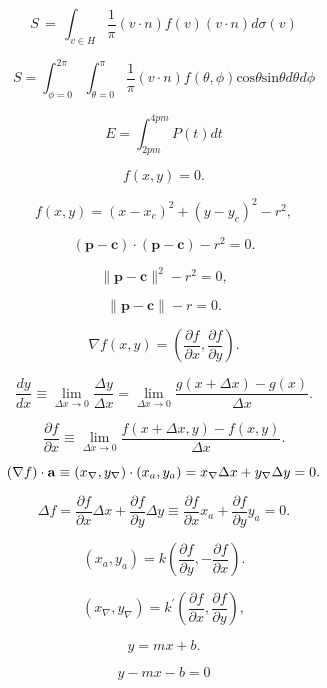 \documentclass[lang=cn,12pt]{elegantbook}
\begin{document}
$$
  S\,=\,\int_{v\in H}\frac{1}{\pi}(v\cdot n)f(v)(v\cdot n)d\sigma(v)
$$

$$
  S=\int_{\phi=0}^{2\pi}\int_{\theta=0}^{\pi}\frac{1}{\pi}(v\cdot n)f(\theta,\phi)\mathrm{cos}\theta\mathrm{sin}\theta d\theta d\phi
$$

$$
  E=\int_{2p m}^{4p m}P(t) dt
$$

$$
  f(x,y)=0.
$$

\begin{equation}
  f(x,y)=(x-x_{c})^{2}+(y-y_{c})^{2}-r^{2},
\end{equation}

$$
  (\mathbf{p}-\mathbf{c})\cdot(\mathbf{p}-\mathbf{c})-r^{2}=0.
$$

$$
  \|\mathbf{p}-\mathbf{c}\|^{2}-r^{2}=0,
$$

$$
  \|\mathbf{p}-\mathbf{c}\|-r=0.
$$

$$
  \nabla f(x,y)=\left({\frac{\partial f}{\partial x}},{\frac{\partial f}{\partial y}}\right).
$$

\begin{equation}
  {\frac{d y}{d x}}\equiv\operatorname*{lim}_{\Delta x\to0}{\frac{\Delta y}{\Delta x}}=\operatorname*{lim}_{\Delta x\to0}{\frac{g(x+\Delta x)-g(x)}{\Delta x}}.
\end{equation}

$$
  {\frac{\partial f}{\partial x}}\equiv\operatorname*{lim}_{\Delta x\to0}{\frac{f(x+\Delta x,y)-f(x,y)}{\Delta x}}.
$$

\begin{equation}
  (\nabla f)\cdot{\bf a}\equiv(x_{\nabla},y_{\nabla})\cdot(x_{a},y_{a})=x_{\nabla}\Delta x+y_{\nabla}\Delta y=0.
\end{equation}

$$
  \Delta f={\frac{\partial f}{\partial x}}\Delta x+{\frac{\partial f}{\partial y}}\Delta y\equiv{\frac{\partial f}{\partial x}}x_{a}+{\frac{\partial f}{\partial y}}y_{a}=0.
$$

\begin{equation}
  (x_{a},y_{a})=k\left({\frac{\partial f}{\partial y}},-{\frac{\partial f}{\partial x}}\right).
\end{equation}

$$
  (x_{\nabla},y_{\nabla})=k^{\prime}\left({\frac{\partial f}{\partial x}},{\frac{\partial f}{\partial y}}\right),
$$

\begin{equation}
  y=mx+b.
\end{equation}

\begin{equation}
  y-mx-b=0
\end{equation}
\end{document}
